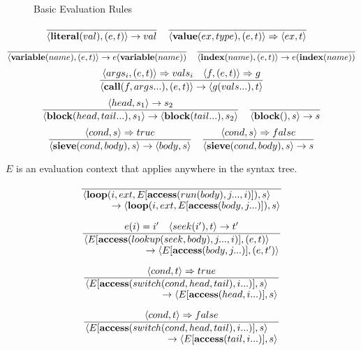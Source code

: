 \begin{figure}
    \centering
    \begin{prooftree}
    \end{prooftree}
    \vspace{2em}
    \caption{Basic Evaluation Rules}
    \label{fig:enter-label}
\end{figure}

\[
    \frac{}{\langle\finchliteral(val), (e, t)\rangle \rightarrow val} \quad
    \frac{}{\langle\finchvalue(ex, type), (e, t)\rangle \Rightarrow \langle ex, t \rangle} \quad
\]
\[
    \frac{}{\langle\finchvar(name), (e, t)\rangle \rightarrow e(\finchvar(name))} \quad
    \frac{}{\langle\finchindex(name), (e, t)\rangle \rightarrow e(\finchindex(name))}
\]
\[
    \frac{\langle args_i, (e, t) \rangle \Rightarrow vals_i \quad \langle f, (e, t) \rangle \Rightarrow g}
    {\langle\finchcall(f, args...), (e, t)\rangle \rightarrow \langle g(vals...), t \rangle}
\]
\[
\frac{\langle head, s_1 \rangle \rightarrow s_2}
{\langle\finchblock(head, tail...), s_1 \rangle \rightarrow \langle \finchblock(tail...), s_2 \rangle} \quad
\frac{}{\langle\finchblock(), s\rangle \rightarrow s}
\]
\[
\frac{\langle cond, s \rangle \Rightarrow true}
{\langle\finchsieve(cond, body), s\rangle \rightarrow \langle body, s \rangle}\quad
\frac{\langle cond, s \rangle \Rightarrow false}
{\langle\finchsieve(cond, body), s\rangle \rightarrow s}
\]

$E$ is an evaluation context that applies anywhere in the syntax tree.



\[
\frac{}
{\splitfrac{\langle \finchloop(i, ext, E[\finchaccess(run(body), j..., i)]), s\rangle
    }{\rightarrow \langle \finchloop(i, ext, E[\finchaccess(body, j...)]), s\rangle}}
\]

\[
\frac{e(i) = i' \quad \langle seek(i'), t \rangle \rightarrow t'}
{\splitfrac{\langle E[\finchaccess(lookup(seek, body), j..., i)], (e, t)\rangle
    }{\rightarrow \langle E[\finchaccess(body, j...)], (e, t')\rangle}}
\]

\[
\frac{\langle cond, t \rangle \Rightarrow true}
{\splitfrac{\langle E[\finchaccess(switch(cond, head, tail), i...)], s\rangle
    }{\rightarrow \langle E[\finchaccess(head, i...)], s\rangle}}
\]

\[
\frac{\langle cond, t \rangle \Rightarrow false}
{\splitfrac{\langle E[\finchaccess(switch(cond, head, tail), i...)], s\rangle
    }{\rightarrow \langle E[\finchaccess(tail, i...)], s\rangle}}
\]


